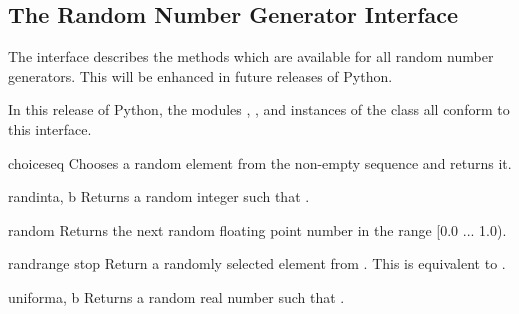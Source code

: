 \begin{seealso}
\end{seealso}


\subsection{The Random Number Generator Interface
            \label{rng-objects}}


The  interface describes the methods
which are available for all random number generators.  This will be
enhanced in future releases of Python.

In this release of Python, the modules ,
, and instances of the
 class all conform to this interface.


\begin{funcdesc}{choice}{seq}
Chooses a random element from the non-empty sequence  and
returns it.
\end{funcdesc}

\begin{funcdesc}{randint}{a, b}
Returns a random integer  such that
.
\end{funcdesc}

\begin{funcdesc}{random}{}
Returns the next random floating point number in the range [0.0
... 1.0).
\end{funcdesc}

\begin{funcdesc}{randrange}{ stop}
Return a randomly selected element from .  This is equivalent to
.
\end{funcdesc}

\begin{funcdesc}{uniform}{a, b}
Returns a random real number  such that
.
\end{funcdesc}
